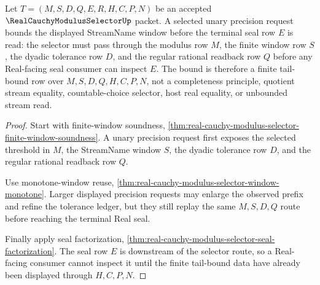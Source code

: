 \begin{theorem}
\label{thm:real-cauchy-modulus-selector-tail-bound}
Let $T=(M,S,D,Q,E,R,H,C,P,N)$ be an accepted $\RealCauchyModulusSelectorUp$ packet. A selected unary precision request bounds the displayed StreamName window before the terminal seal row $E$ is read: the selector must pass through the modulus row $M$, the finite window row $S$, the dyadic tolerance row $D$, and the regular rational readback row $Q$ before any Real-facing seal consumer can inspect $E$. The bound is therefore a finite tail-bound row over $M,S,D,Q,H,C,P,N$, not a completeness principle, quotient stream equality, countable-choice selector, host real equality, or unbounded stream read.
\end{theorem}
\begin{proof}
Start with finite-window soundness, \autoref{thm:real-cauchy-modulus-selector-finite-window-soundness}. A unary precision request first exposes the selected threshold in $M$, the StreamName window $S$, the dyadic tolerance row $D$, and the regular rational readback row $Q$.

Use monotone-window reuse, \autoref{thm:real-cauchy-modulus-selector-window-monotone}. Larger displayed precision requests may enlarge the observed prefix and refine the tolerance ledger, but they still replay the same $M,S,D,Q$ route before reaching the terminal Real seal.

Finally apply seal factorization, \autoref{thm:real-cauchy-modulus-selector-seal-factorization}. The seal row $E$ is downstream of the selector route, so a Real-facing consumer cannot inspect it until the finite tail-bound data have already been displayed through $H,C,P,N$.
\end{proof}

